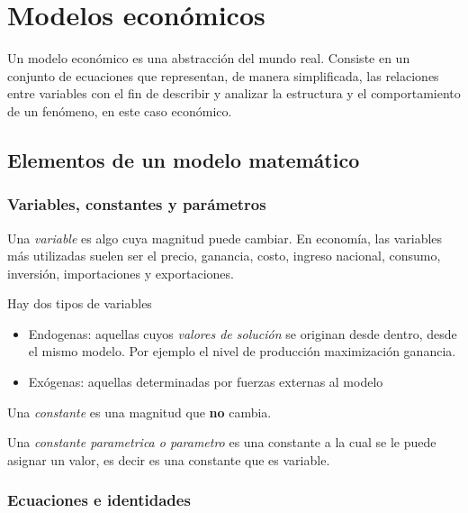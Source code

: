 \section{Modelos económicos}

Un modelo económico es una abstracción del mundo real. Consiste en un conjunto de ecuaciones que representan, de manera simplificada, 
las relaciones entre variables con el fin de describir y analizar la estructura y el comportamiento de un fenómeno, en este caso económico.

\subsection{Elementos de un modelo matemático}

\subsubsection{Variables, constantes y parámetros}

Una \textit{variable} es algo cuya magnitud puede cambiar. En economía, las variables más utilizadas suelen ser el
precio, ganancia, costo, ingreso nacional, consumo, inversión, importaciones y exportaciones.

Hay dos tipos de variables
\begin{itemize}
    \item Endogenas: aquellas cuyos \textit{valores de solución} se originan desde dentro, desde el mismo modelo.
    Por ejemplo el nivel de producción maximización ganancia.
    \item Exógenas: aquellas determinadas por fuerzas externas al modelo
\end{itemize}

Una \textit{constante} es una magnitud que \textbf{no} cambia. 

Una \textit{constante parametrica o parametro} es una constante a la cual se le puede asignar un valor, es decir 
es una constante que es variable.

\subsubsection{Ecuaciones e identidades}

